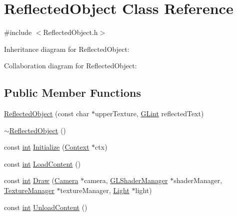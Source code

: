 \hypertarget{class_reflected_object}{\section{Reflected\-Object Class Reference}
\label{class_reflected_object}
}


{\ttfamily \#include $<$Reflected\-Object.\-h$>$}



Inheritance diagram for Reflected\-Object\-:


Collaboration diagram for Reflected\-Object\-:
\subsection*{Public Member Functions}
\begin{DoxyCompactItemize}
\item 
\hyperlink{class_reflected_object_a8711e4d9032dadb5d5b81f552cc2562a}{Reflected\-Object} (const char $\ast$upper\-Texture, \hyperlink{_g_l_e_w_2glew_8h_acebcc1c5663f14ebde1d16831e5fed94}{G\-Lint} reflected\-Text)
\item 
\hyperlink{class_reflected_object_acf8abc601d8b7b3bf572285b640f4151}{$\sim$\-Reflected\-Object} ()
\item 
const \hyperlink{_s_d_l__thread_8h_a6a64f9be4433e4de6e2f2f548cf3c08e}{int} \hyperlink{class_reflected_object_a23a203d873af1f447c0f401ff43c9ed3}{Initialize} (\hyperlink{class_context}{Context} $\ast$ctx)
\item 
const \hyperlink{_s_d_l__thread_8h_a6a64f9be4433e4de6e2f2f548cf3c08e}{int} \hyperlink{class_reflected_object_a88763d37ca6b0dccbe0ade77510c3103}{Load\-Content} ()
\item 
const \hyperlink{_s_d_l__thread_8h_a6a64f9be4433e4de6e2f2f548cf3c08e}{int} \hyperlink{class_reflected_object_a4c8c2856d74cb357d7698ede5114bed3}{Draw} (\hyperlink{class_camera}{Camera} $\ast$camera, \hyperlink{class_g_l_shader_manager}{G\-L\-Shader\-Manager} $\ast$shader\-Manager, \hyperlink{class_texture_manager}{Texture\-Manager} $\ast$texture\-Manager, \hyperlink{class_light}{Light} $\ast$light)
\item 
const \hyperlink{_s_d_l__thread_8h_a6a64f9be4433e4de6e2f2f548cf3c08e}{int} \hyperlink{class_reflected_object_a332b863a984c7e6bdc83a5465ea6710f}{Unload\-Content} ()
\end{DoxyCompactItemize}
